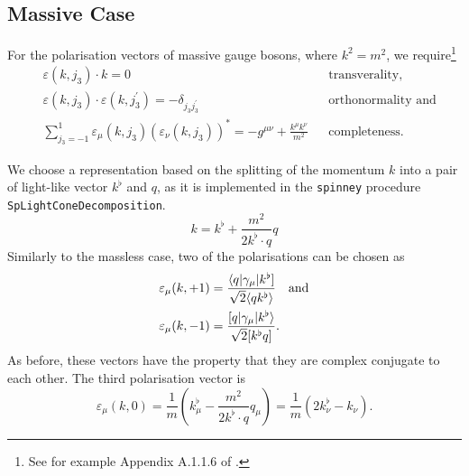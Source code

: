 \documentclass[a4paper,12pt]{amsart}
\newcommand{\Spaa}[1]{\langle #1 \rangle}
\newcommand{\Spab}[1]{\langle #1]}
\newcommand{\Spba}[1]{[ #1 \rangle}
\newcommand{\Spbb}[1]{[ #1 ]}
\begin{document}
\subsection{Massive Case}
For the polarisation vectors of massive gauge bosons, where $k^2=m^2$,
we require\footnote{See for example Appendix A{.}1{.}1{.}6 of \cite{1}.}
\begin{align}
&\varepsilon(k, j_3)\cdot k = 0 & &\text{transverality,}\\
&\varepsilon(k, j_3)\cdot \varepsilon(k, j_3^\prime)=-\delta_{j_3j_3^\prime}&
&\text{orthonormality and}\\
&\sum_{j_3=-1}^1\varepsilon_\mu(k, j_3)\left(\varepsilon_\nu(k, j_3)\right)^\ast
=-g^{\mu\nu}+\frac{k^\mu k^\nu}{m^2}& &\text{completeness.}
\end{align}

We choose a representation based on the splitting of
the momentum $k$ into a pair of light-like vector $k^\flat$ and $q$,
as it is implemented in the \texttt{spinney} procedure
\texttt{SpLightConeDecomposition}.
\begin{equation}
k=k^\flat+\frac{m^2}{2k^\flat\cdot q}q
\end{equation}
Similarly to the massless case, two of the polarisations can be chosen
as
\begin{align}
\varepsilon_\mu(k, +1) &= \frac{\Spab{q\vert\gamma_\mu\vert k^\flat}}{%
   \sqrt{2}\Spaa{qk^\flat}}\quad\text{and}\\
\varepsilon_\mu(k, -1) &= \frac{\Spba{q\vert\gamma_\mu\vert k^\flat}}{%
   \sqrt{2}\Spbb{k^\flat q}}\text{.}
\end{align}
As before, these vectors have the property that they are complex
conjugate to each other.
The third polarisation vector is
\begin{equation}
\varepsilon_\mu(k, 0) = \frac{1}{m}\left(k^\flat_\mu
-\frac{m^2}{2k^\flat\cdot q}q_\mu\right)=
\frac{1}{m}\left(2k^\flat_\nu-k_\nu\right)\text{.}
\end{equation}
\end{document}

